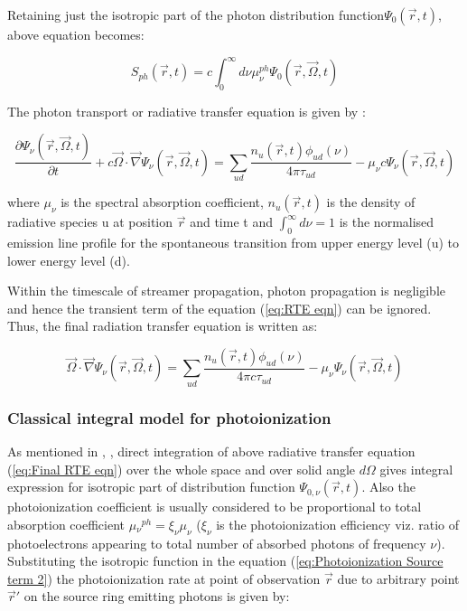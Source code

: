 \documentclass[paper=a4, fontsize=13pt]{scrartcl}
\begin{document}
Retaining just the isotropic part of the photon distribution function$\Psi_0(\vec{r},t)$, above equation becomes:

\begin{equation} \label{eq:Photoionization Source term 2}
S_{ph} (\vec{r},t) = c\int_{0}^{\infty}d\nu \mu_{\nu}^{ph}  \Psi_0(\vec{r},\vec{\Omega},t)
\end{equation}

The photon transport or radiative transfer equation is given by :

\begin{equation}\label{eq:RTE eqn}
\frac{\partial\Psi_\nu(\vec{r},\vec{\Omega},t)}{\partial t} + c\vec{\Omega} \cdot \vec{\nabla} \Psi_\nu(\vec{r},\vec{\Omega},t) = \sum_{ud} \frac{n_u (\vec{r},t)\phi_{ud} (\nu)}{4 \pi \tau_{ud}} - \mu_\nu c \Psi_\nu(\vec{r},\vec{\Omega},t)
\end{equation}

where $\mu_\nu$ is the spectral absorption coefficient, $n_u(\vec{r},t)$ is the density of radiative species u at position $\vec{r}$ and time t and $\int_{0}^{\infty}d\nu = 1$ is the normalised emission line profile for the spontaneous transition from upper energy level (u) to lower energy level (d). 

Within the timescale of streamer propagation, photon propagation is negligible and hence the transient term of the equation (\ref{eq:RTE eqn}) can be ignored. Thus, the final radiation transfer equation is written as:

\begin{equation} \label{eq:Final RTE eqn}
\vec{\Omega} \cdot \vec{\nabla} \Psi_\nu(\vec{r},\vec{\Omega},t) = \sum_{ud} \frac{n_u (\vec{r},t)\phi_{ud} (\nu)}{4 \pi c \tau_{ud}} - \mu_\nu \Psi_\nu(\vec{r},\vec{\Omega},t)
\end{equation}

\subsubsection{Classical integral model for photoionization}

As mentioned in \cite{Bourdon2007EfficientEquations}, \cite{ZhelezniakM.B.andMnatsakanianA.K.andSizykh1982PhotoionizationDischarge}, direct integration of above radiative transfer equation (\ref{eq:Final RTE eqn}) over the whole space and over solid angle $d\Omega$ gives integral expression for isotropic part of distribution function $\Psi_{0,\nu}(\vec{r},t)$. Also the photoionization coefficient is usually considered to be proportional to total absorption coefficient $\mu{_\nu}^{ph}= \xi_\nu \mu_\nu$ ($\xi_\nu$ is the photoionization efficiency viz. ratio of photoelectrons appearing to total number of absorbed photons of frequency $\nu$). Substituting the isotropic function in the equation (\ref{eq:Photoionization Source term 2}) the photoionization rate at point of observation $\vec{r}$ due to arbitrary point $\vec{r}'$ on the source ring emitting photons is given by:
\end{document}
